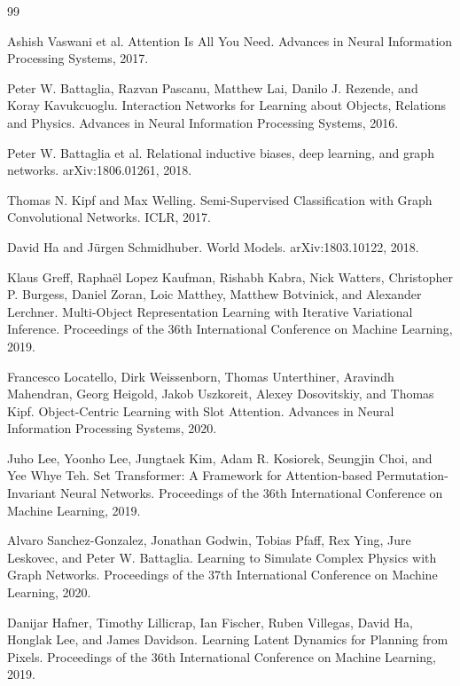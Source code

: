 \documentclass[11pt]{article}
\begin{document}
\begin{thebibliography}{99}

Ashish Vaswani et al.
\newblock Attention Is All You Need.
\newblock Advances in Neural Information Processing Systems, 2017.

Peter W. Battaglia, Razvan Pascanu, Matthew Lai, Danilo J. Rezende, and Koray
Kavukcuoglu.
\newblock Interaction Networks for Learning about Objects, Relations and
Physics.
\newblock Advances in Neural Information Processing Systems, 2016.

Peter W. Battaglia et al.
\newblock Relational inductive biases, deep learning, and graph networks.
\newblock arXiv:1806.01261, 2018.

Thomas N. Kipf and Max Welling.
\newblock Semi-Supervised Classification with Graph Convolutional Networks.
\newblock ICLR, 2017.

David Ha and J{\"u}rgen Schmidhuber.
\newblock World Models.
\newblock arXiv:1803.10122, 2018.

Klaus Greff, Rapha{\"e}l Lopez Kaufman, Rishabh Kabra, Nick Watters,
Christopher P. Burgess, Daniel Zoran, Loic Matthey, Matthew Botvinick, and
Alexander Lerchner.
\newblock Multi-Object Representation Learning with Iterative Variational
Inference.
\newblock Proceedings of the 36th International Conference on Machine Learning,
2019.

Francesco Locatello, Dirk Weissenborn, Thomas Unterthiner, Aravindh Mahendran,
Georg Heigold, Jakob Uszkoreit, Alexey Dosovitskiy, and Thomas Kipf.
\newblock Object-Centric Learning with Slot Attention.
\newblock Advances in Neural Information Processing Systems, 2020.

Juho Lee, Yoonho Lee, Jungtaek Kim, Adam R. Kosiorek, Seungjin Choi, and Yee
Whye Teh.
\newblock Set Transformer: A Framework for Attention-based Permutation-Invariant
Neural Networks.
\newblock Proceedings of the 36th International Conference on Machine Learning,
2019.

Alvaro Sanchez-Gonzalez, Jonathan Godwin, Tobias Pfaff, Rex Ying, Jure Leskovec,
and Peter W. Battaglia.
\newblock Learning to Simulate Complex Physics with Graph Networks.
\newblock Proceedings of the 37th International Conference on Machine Learning,
2020.

Danijar Hafner, Timothy Lillicrap, Ian Fischer, Ruben Villegas, David Ha,
Honglak Lee, and James Davidson.
\newblock Learning Latent Dynamics for Planning from Pixels.
\newblock Proceedings of the 36th International Conference on Machine Learning,
2019.


\end{thebibliography}
\end{document}

